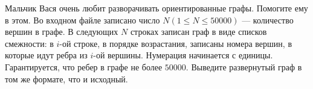 Мальчик Вася очень любит разворачивать ориентированные графы. Помогите ему в этом.
\InputFile
Во входном файле записано число $N (1 \leq N \leq 50000)$ --- количество вершин в графе.
В следующих $N$ строках записан граф в виде списков смежности: в $i$-ой строке, в порядке возрастания, записаны номера вершин,
 в которые идут ребра из $i$-ой вершины.
 Нумерация начинается с единицы. Гарантируется, что ребер в графе не более $50000$.
\OutputFile
Выведите развернутый граф в том же формате, что и исходный.

